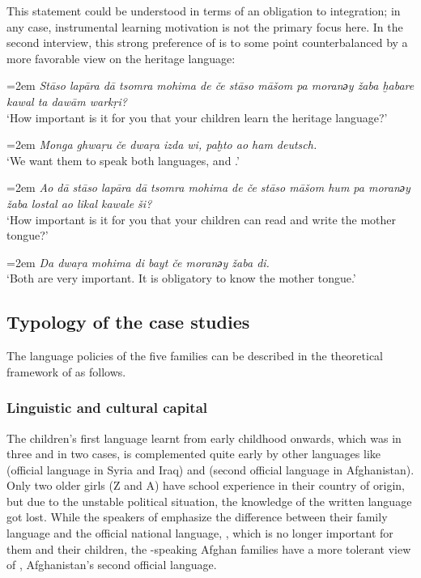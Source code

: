 \documentclass[output=paper,colorlinks,citecolor=brown]{langscibook}
\newenvironment{interview}{
  \setlength{\leftskip}{2.5em} %
  \setlength{\rightskip}{2.5em} %
  \setlength{\parindent}{0pt} %
  \vspace{\topsep} %
}{
  \vspace{\topsep} %
}
\newcommand{\speaker}[1]{%
  \noindent\hangindent=2em\makebox[1.5em][l]{#1:}\hspace{0.5em}%
}
\newcommand{\myattrib}[1]{%
    \attrib{#1}
}
\begin{document}
This statement could be understood in terms of an obligation to integration; in any case, instrumental learning motivation is not the primary focus here. In the second interview, this strong preference of  is to some point counterbalanced by a more favorable view on the heritage language:

\begin{interview}\label{ch2.5.ex.41}
\speaker{I}\textit{Stāso lapāra dā tsomra mohima de če stāso māšom pa moranәy žaba ḫabare kawal ta dawām warkṛi?}  \\
`How important is it for you that your children learn the heritage language?'

\speaker{FE}\textit{Monga ghwaṛu če dwaṛa izda wi, paḫto ao ham deutsch.} \\
`We want them to speak both languages,  and .' 

\speaker{I}\textit{Ao dā stāso lapāra dā tsomra mohima de če stāso māšom hum pa moranәy žaba lostal ao likal kawale ši?}\\ 
`How important is it for you that your children can read and write the mother tongue?' 

\speaker{FE}\textit{Da dwaṛa mohima di bayt če moranәy žaba di.} \\
`Both are very important. It is obligatory to know the mother tongue.' 
\myattrib{Int 2\_E\_father 6, 152--161}
\end{interview}

\subsection{Typology of the case studies}\label{ch2.5.ss.4.4}

The language policies of the five families can be described in the theoretical framework of \citet{darvin_norton2015,darvin_norton2017} as follows. 

\subsubsection{Linguistic and cultural capital}

The children's first  language learnt from early childhood onwards, which was  in three and  in two cases, is complemented quite early by other languages like  (official language in Syria and Iraq) and  (second official language in Afghanistan). Only two older girls (Z and A) have school experience in their country of origin, but due to the unstable political situation, the knowledge of the written language got lost. While the speakers of  emphasize the difference between their family language and the official national language, , which is no longer important for them and their children, the -speaking Afghan families have a more tolerant view of , Afghanistan's second official language. 
\end{document}
